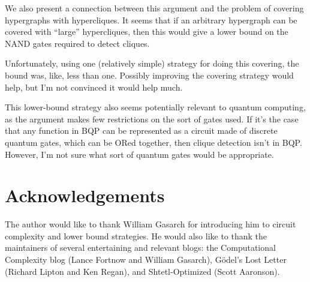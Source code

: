 \documentclass[12pt]{article}
\theoremstyle{definition}
\begin{document}
We also present a connection between this argument and the problem of covering
hypergraphs with hypercliques.
It seems that if an arbitrary hypergraph can be covered with 
``large'' hypercliques,
then this would give a lower bound on the NAND gates required to
detect cliques.

Unfortunately, using one (relatively simple) strategy for doing this covering,
the bound was, like, less than one. Possibly improving the covering
strategy would help, but I'm not convinced it would help much.

This lower-bound strategy also seems potentially
relevant to quantum computing,
as the argument makes few restrictions on the sort of gates used.
If it's the case that any function in BQP can be represented
as a circuit made of discrete quantum gates, which can be
ORed together, then clique detection isn't in BQP.
However, I'm not sure what sort of quantum gates would be
appropriate.

\section{Acknowledgements}

The author would like to thank William Gasarch for introducing him
to circuit complexity and lower bound strategies.
He would also like to thank the maintainers of
several entertaining and relevant blogs: the Computational Complexity blog
(Lance Fortnow and William Gasarch), 
G\"odel's Lost Letter (Richard Lipton and Ken Regan),
and Shtetl-Optimized (Scott Aaronson). 



\end{document}
